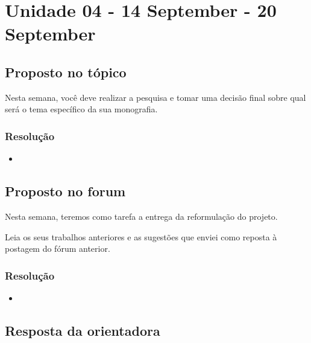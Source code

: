 

\chapter{Unidade 04 - 14 September - 20 September}

\section{Proposto no tópico}

Nesta semana, você deve realizar a pesquisa e tomar uma decisão final sobre qual será o tema específico da sua monografia.


\subsection{Resolução}


\begin{itemize}
  \item 
\end{itemize}

\section{Proposto no forum}

Nesta semana, teremos como tarefa a entrega da reformulação do projeto.

Leia os seus trabalhos anteriores e as sugestões que enviei como reposta à postagem do fórum anterior.


\subsection{Resolução}

\begin{itemize}
	\item 
\end{itemize}

\section{Resposta da orientadora}

